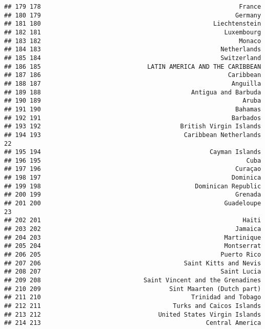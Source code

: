 \documentclass[]{article}
\begin{document}
\begin{verbatim}
## 179 178                                                      France   
## 180 179                                                     Germany   
## 181 180                                               Liechtenstein   
## 182 181                                                  Luxembourg   
## 183 182                                                      Monaco   
## 184 183                                                 Netherlands   
## 185 184                                                 Switzerland   
## 186 185                             LATIN AMERICA AND THE CARIBBEAN   
## 187 186                                                   Caribbean   
## 188 187                                                    Anguilla   
## 189 188                                         Antigua and Barbuda   
## 190 189                                                       Aruba   
## 191 190                                                     Bahamas   
## 192 191                                                    Barbados   
## 193 192                                      British Virgin Islands   
## 194 193                                       Caribbean Netherlands 22
## 195 194                                              Cayman Islands   
## 196 195                                                        Cuba   
## 197 196                                                     Curaçao   
## 198 197                                                    Dominica   
## 199 198                                          Dominican Republic   
## 200 199                                                     Grenada   
## 201 200                                                  Guadeloupe 23
## 202 201                                                       Haiti   
## 203 202                                                     Jamaica   
## 204 203                                                  Martinique   
## 205 204                                                  Montserrat   
## 206 205                                                 Puerto Rico   
## 207 206                                       Saint Kitts and Nevis   
## 208 207                                                 Saint Lucia   
## 209 208                            Saint Vincent and the Grenadines   
## 210 209                                   Sint Maarten (Dutch part)   
## 211 210                                         Trinidad and Tobago   
## 212 211                                    Turks and Caicos Islands   
## 213 212                                United States Virgin Islands   
## 214 213                                             Central America   

\end{verbatim}
\end{document}
